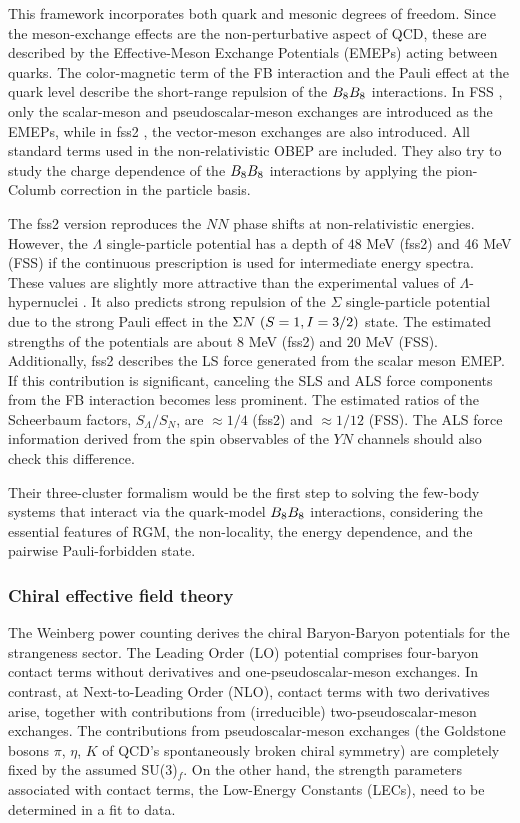 This framework incorporates both quark and mesonic degrees of freedom. Since the meson-exchange effects are the non-perturbative aspect of QCD, these are described by the Effective-Meson Exchange Potentials (EMEPs) acting between quarks. The color-magnetic term of the FB interaction and the Pauli effect at the quark level describe the short-range repulsion of the $B_{8}B_{8}$ interactions. In FSS \cite{FSS}, only the scalar-meson and pseudoscalar-meson exchanges are introduced as the EMEPs, while in fss2 \cite{fss2}, the vector-meson exchanges are also introduced. All standard terms used in the non-relativistic OBEP are included. They also try to study the charge dependence of the $B_{8}B_{8}$ interactions by applying the pion-Columb correction in the particle basis. 

The fss2 version reproduces the $NN$ phase shifts at non-relativistic energies. However, the $\Lambda$ single-particle potential has a depth of 48 MeV (fss2) and 46 MeV (FSS) if the continuous prescription is used for intermediate energy spectra. These values are slightly more attractive than the experimental values of $\Lambda$-hypernuclei \cite{Bando-1990}. It also predicts strong repulsion of the $\Sigma$ single-particle potential due to the strong Pauli effect in the $\Sigma N\ (S = 1, I = 3/2)$ state. The estimated strengths of the potentials are about 8 MeV (fss2) and 20 MeV (FSS). %
Additionally, fss2 describes the LS force generated from the scalar meson EMEP. If this contribution is significant, canceling the SLS and ALS force components from the FB interaction becomes less prominent. The estimated ratios of the Scheerbaum factors, $S_{\Lambda}/S_N$, are $\approx1/4$ (fss2) and $\approx1/12$ (FSS). The ALS force information derived from the spin observables of the $YN$ channels should also check this difference. 

Their three-cluster formalism would be the first step to solving the few-body systems that interact via the quark-model $B_{8}B_{8}$ interactions, considering the essential features of RGM, the non-locality, the energy dependence, and the pairwise Pauli-forbidden state.


\subsubsection{Chiral effective field theory}
The Weinberg power counting derives the chiral Baryon-Baryon potentials for the strangeness sector. The Leading Order (LO) potential comprises four-baryon contact terms without derivatives and one-pseudoscalar-meson exchanges. In contrast, at Next-to-Leading Order (NLO), contact terms with two derivatives arise, together with contributions from (irreducible) two-pseudoscalar-meson exchanges. The contributions from pseudoscalar-meson exchanges (the Goldstone bosons $\pi$, $\eta$, $K$ of QCD's spontaneously broken chiral symmetry) are completely fixed by the assumed SU(3)$_f$. On the other hand, the strength parameters associated with contact terms, the Low-Energy Constants (LECs), need to be determined in a fit to data. 

